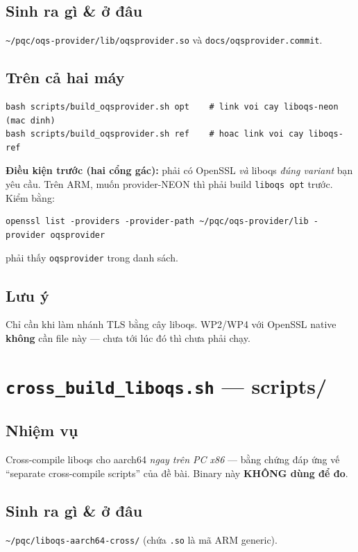 \documentclass[11pt,a4paper]{article}
\begin{document}
\subsection*{Sinh ra gì \& ở đâu}
\verb|~/pqc/oqs-provider/lib/oqsprovider.so| và \verb|docs/oqsprovider.commit|.

\subsection*{Trên cả hai máy}
\begin{lstlisting}
bash scripts/build_oqsprovider.sh opt    # link voi cay liboqs-neon (mac dinh)
bash scripts/build_oqsprovider.sh ref    # hoac link voi cay liboqs-ref
\end{lstlisting}
\textbf{Điều kiện trước (hai cổng gác):} phải có OpenSSL \emph{và} liboqs \emph{đúng variant} bạn yêu cầu. Trên ARM, muốn provider-NEON thì phải build \verb|liboqs opt| trước. Kiểm bằng:
\begin{lstlisting}
openssl list -providers -provider-path ~/pqc/oqs-provider/lib -provider oqsprovider
\end{lstlisting}
phải thấy \verb|oqsprovider| trong danh sách.

\subsection*{Lưu ý}
Chỉ cần khi làm nhánh TLS bằng cây liboqs. WP2/WP4 với OpenSSL native \textbf{không} cần file này — chưa tới lúc đó thì chưa phải chạy.

\section{\texttt{cross\_build\_liboqs.sh} — \textmd{\normalsize scripts/}}

\subsection*{Nhiệm vụ}
Cross-compile liboqs cho aarch64 \emph{ngay trên PC x86} — bằng chứng đáp ứng vế ``separate cross-compile scripts'' của đề bài. Binary này \textbf{KHÔNG dùng để đo}.

\subsection*{Sinh ra gì \& ở đâu}
\verb|~/pqc/liboqs-aarch64-cross/| (chứa \verb|.so| là mã ARM generic).
\end{document}
